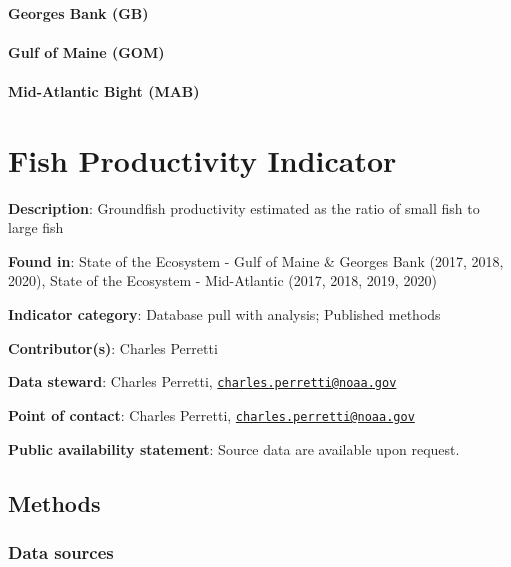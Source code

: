 \documentclass[
]{book}
\begin{document}
\hypertarget{georges-bank-gb}{%
\subsubsection{Georges Bank (GB)}\label{georges-bank-gb}}

\hypertarget{gulf-of-maine-gom}{%
\subsubsection{Gulf of Maine (GOM)}\label{gulf-of-maine-gom}}

\hypertarget{mid-atlantic-bight-mab}{%
\subsubsection{Mid-Atlantic Bight (MAB)}\label{mid-atlantic-bight-mab}}

\hypertarget{fish-productivity-indicator}{%
\chapter{Fish Productivity Indicator}\label{fish-productivity-indicator}}

\textbf{Description}: Groundfish productivity estimated as the ratio of small fish to large fish

\textbf{Found in}: State of the Ecosystem - Gulf of Maine \& Georges Bank (2017, 2018, 2020), State of the Ecosystem - Mid-Atlantic (2017, 2018, 2019, 2020)

\textbf{Indicator category}: Database pull with analysis; Published methods

\textbf{Contributor(s)}: Charles Perretti

\textbf{Data steward}: Charles Perretti, \href{mailto:charles.perretti@noaa.gov}{\nolinkurl{charles.perretti@noaa.gov}}

\textbf{Point of contact}: Charles Perretti, \href{mailto:charles.perretti@noaa.gov}{\nolinkurl{charles.perretti@noaa.gov}}

\textbf{Public availability statement}: Source data are available upon request.

\hypertarget{methods-28}{%
\section{Methods}\label{methods-28}}

\hypertarget{data-sources-28}{%
\subsection{Data sources}\label{data-sources-28}}
\end{document}
